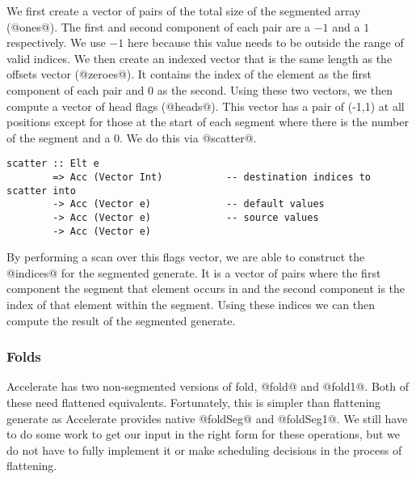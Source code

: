 We first create a vector of pairs of the total size of the segmented array (@ones@). The first and second component of each pair are a $-1$ and a $1$ respectively. We use $-1$ here because this value needs to be outside the range of valid indices. We then create an indexed vector that is the same length as the offsets vector (@zeroes@). It contains the index of the element as the first component of each pair and 0 as the second. Using these two vectors, we then compute a vector of head flags (@heads@). This vector has a pair of (-1,1) at all positions except for those at the start of each segment where there is the number of the segment and a 0. We do this via @scatter@.
%
\begin{lstlisting}
scatter :: Elt e
        => Acc (Vector Int)           -- destination indices to scatter into
        -> Acc (Vector e)             -- default values
        -> Acc (Vector e)             -- source values
        -> Acc (Vector e)
\end{lstlisting}
%
By performing a scan over this flags vector, we are able to construct the @indices@ for the segmented generate. It is a vector of pairs where the first component the segment that element occurs in and the second component is the index of that element within the segment. Using these indices we can then compute the result of the segmented generate.

\subsubsection{Folds}
Accelerate has two non-segmented versions of fold, @fold@ and @fold1@. Both of these need flattened equivalents. Fortunately, this is simpler than flattening generate as Accelerate provides native @foldSeg@ and @foldSeg1@. We still have to do some work to get our input in the right form for these operations, but we do not have to fully implement it or make scheduling decisions in the process of flattening.

